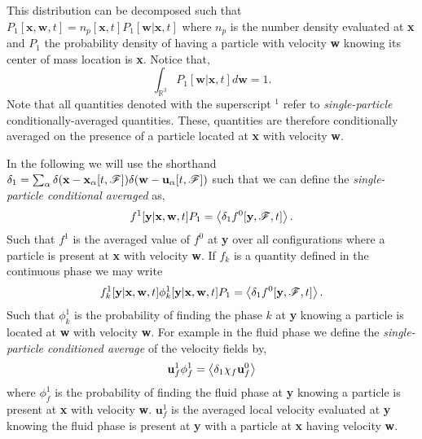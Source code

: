 This distribution can be decomposed such that $P_1[\textbf{x},\textbf{w},t] = n_p[\textbf{x},t] P_1[\textbf{w}|\textbf{x},t]$ where $n_p$ is the number density evaluated at \textbf{x} and $P_1$ the probability density of having a particle with velocity \textbf{w} knowing its center of mass location is \textbf{x}. 
Notice that, 
\begin{equation*}
    \int_{\mathbb{R}^3} P_1[\textbf{w}|\textbf{x},t] d \textbf{w} = 1. 
\end{equation*}
Note that all quantities denoted with the superscript $^1$ refer to \textit{single-particle} conditionally-averaged  quantities.  
These, quantities are therefore conditionally averaged on the presence of a particle located at \textbf{x} with velocity \textbf{w}. 

In the following we will use the shorthand $\delta_1 = \sum_\alpha \delta(\textbf{x} - \textbf{x}_\alpha[t,\mathscr{F}]) \delta(\textbf{w} - \textbf{u}_\alpha[t,\mathscr{F}])$ such that we can define the \textit{single-particle conditional averaged} as, 
\begin{equation*}
    f^1[\textbf{y}|\textbf{x},\textbf{w},t] P_1 = \left<\delta_1 f^0[\textbf{y},\mathscr{F},t]\right>.
\end{equation*}
Such that $f^1$ is the averaged value of $f^0$ at \textbf{y} over all configurations where a particle is present at \textbf{x} with velocity \textbf{w}. 
If $f_k$ is a quantity defined in the continuous phase we may write 
\begin{equation*}
    f^1_k[\textbf{y}|\textbf{x},\textbf{w},t] \phi_k^1[\textbf{y}|\textbf{x},\textbf{w},t]  P_1 = \left<\delta_1 f^0[\textbf{y},\mathscr{F},t]\right>.
\end{equation*}
Such that $\phi_k^1$ is the probability of finding the phase $k$ at \textbf{y} knowing a particle is located at \textbf{w} with velocity \textbf{w}. 
For example in the fluid phase we define the \textit{single-particle conditioned average} of the velocity fields by, 
\begin{equation*}
    \textbf{u}_f^1 \phi_f^1 
    = \left<\delta_1 \chi_f \textbf{u}_f^0\right>
\end{equation*} 
where $\phi_f^1$ is the probability of finding the fluid phase at \textbf{y} knowing a particle is present at \textbf{x} with velocity \textbf{w}. $\textbf{u}_f^1$ is the averaged local velocity evaluated at \textbf{y} knowing the fluid phase is present at \textbf{y} with a particle at \textbf{x} having velocity \textbf{w}. 

